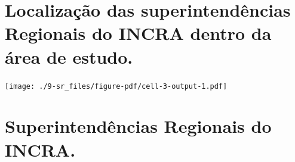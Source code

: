 \documentclass[
  letterpaper,
]{report}
\begin{document}
\hypertarget{localizauxe7uxe3o-das-superintenduxeancias-regionais-do-incra-dentro-da-uxe1rea-de-estudo.}{%
\section{Localização das superintendências Regionais do INCRA dentro da
área de
estudo.}\label{localizauxe7uxe3o-das-superintenduxeancias-regionais-do-incra-dentro-da-uxe1rea-de-estudo.}}

\texttt{[image: ./9-sr\_files/figure-pdf/cell-3-output-1.pdf]}

\hypertarget{superintenduxeancias-regionais-do-incra.}{%
\section{Superintendências Regionais do
INCRA.}\label{superintenduxeancias-regionais-do-incra.}}
\end{document}
